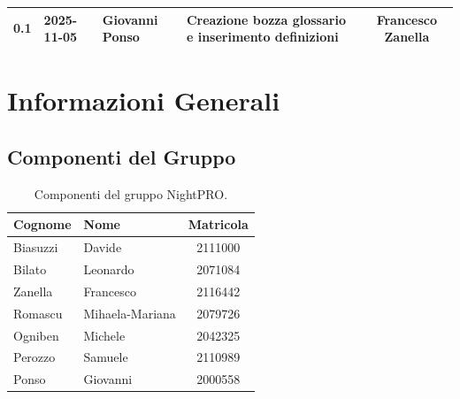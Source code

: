 \documentclass[a4paper, 11pt, oneside]{scrartcl} %
\begin{document}
\begin{center}
{\begin{tabular}{@{}llp{}p{}c@{}}
            0.1                                                                                                                                                            & 2025-11-05      & Giovanni Ponso    & Creazione bozza glossario e inserimento definizioni                                                                                                                                                                                                                                                                                                                                                                                      & Francesco Zanella     \\
            \bottomrule
        \end{tabular}
    }
\end{center}


\newpage
\tableofcontents %
\pagestyle{fancy}

\newpage
\section{Informazioni Generali}

\subsection{Componenti del Gruppo}

\begin{table}[h!]
    \centering
    \renewcommand{\arraystretch}{1.2} %
    \begin{tabular}{@{}llc@{}}
        \toprule
        \textbf{Cognome} & \textbf{Nome}   & \textbf{Matricola} \\
        \midrule
        Biasuzzi         & Davide          & 2111000            \\
        Bilato           & Leonardo        & 2071084            \\
        Zanella          & Francesco       & 2116442            \\
        Romascu          & Mihaela-Mariana & 2079726            \\
        Ogniben          & Michele         & 2042325            \\
        Perozzo          & Samuele         & 2110989            \\
        Ponso            & Giovanni        & 2000558            \\
        \bottomrule
    \end{tabular}
    \caption{Componenti del gruppo NightPRO.}
\end{table}
\end{document}
